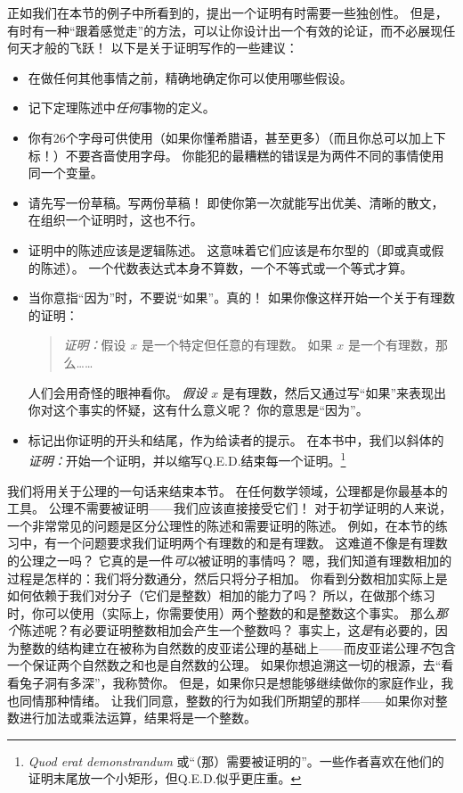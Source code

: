 正如我们在本节的例子中所看到的，提出一个证明有时需要一些独创性。
但是，有时有一种“跟着感觉走”的方法，可以让你设计出一个有效的论证，而不必展现任何天才般的飞跃！
以下是关于证明写作的一些建议：

\begin{itemize}
      \item 
            在做任何其他事情之前，精确地确定你可以使用哪些假设。
      \item 
            记下定理陈述中{\em 任何}事物的定义。
      \item 
            你有26个字母可供使用（如果你懂希腊语，甚至更多）（而且你总可以加上下标！）不要吝啬使用字母。
            你能犯的最糟糕的错误是为两件不同的事情使用同一个变量。
      \item 
            请先写一份草稿。写两份草稿！
            即使你第一次就能写出优美、清晰的散文，在组织一个证明时，这也不行。
      \item 
            证明中的陈述应该是逻辑陈述。    
            这意味着它们应该是布尔型的（即或真或假的陈述）。
            一个代数表达式本身不算数，一个不等式或一个等式才算。
      \item 
            当你意指“因为”时，不要说“如果”。真的！
            如果你像这样开始一个关于有理数的证明：
            \begin{quote}                 
                        {\em 证明：}假设 $x$ 是一个特定但任意的有理数。
                  如果 $x$ 是一个有理数，那么……
            \end{quote}

            \noindent 人们会用奇怪的眼神看你。
            {\em 假设} $x$ 是有理数，然后又通过写“如果”来表现出你对这个事实的怀疑，这有什么意义呢？
            你的意思是“因为”。
      \item 
            标记出你证明的开头和结尾，作为给读者的提示。
            在本书中，我们以斜体的{\em 证明：}开始一个证明，并以缩写Q.E.D.结束每一个证明。\footnote{{\em Quod erat demonstrandum} 或“（那）需要被证明的”。一些作者喜欢在他们的证明末尾放一个小矩形，但Q.E.D.似乎更庄重。}
\end{itemize}

\newpage

我们将用关于公理的一句话来结束本节。
在任何数学领域，公理都是你最基本的工具。
公理不需要被证明——我们应该直接接受它们！
对于初学证明的人来说，一个非常常见的问题是区分公理性的陈述和需要证明的陈述。
例如，在本节的练习中，有一个问题要求我们证明两个有理数的和是有理数。
这难道不像是有理数的公理之一吗？
它真的是一件{\em 可以}被证明的事情吗？
嗯，我们知道有理数相加的过程是怎样的：我们将分数通分，然后只将分子相加。
你看到分数相加实际上是如何依赖于我们对分子（它们是整数）相加的能力了吗？
所以，在做那个练习时，你可以使用（实际上，你需要使用）两个整数的和是整数这个事实。
那么{\em 那个}陈述呢？有必要证明整数相加会产生一个整数吗？
事实上，这{\em 是}有必要的，因为整数的结构建立在被称为自然数的皮亚诺公理的基础上——而皮亚诺公理{\em 不}包含一个保证两个自然数之和也是自然数的公理。
如果你想追溯这一切的根源，去“看看兔子洞有多深”，我称赞你。
但是，如果你只是想能够继续做你的家庭作业，我也同情那种情绪。
让我们同意，整数的行为如我们所期望的那样——如果你对整数进行加法或乘法运算，结果将是一个整数。

